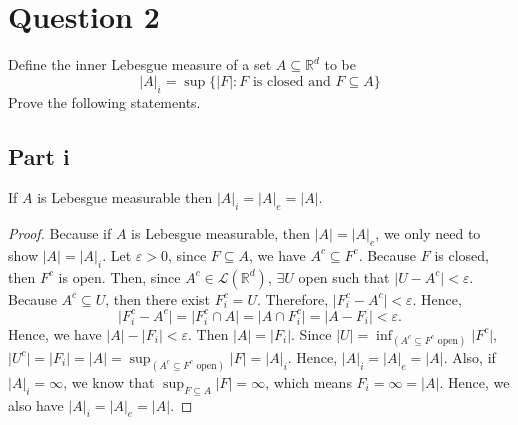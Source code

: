 \section{Question 2}

\begin{question}
    Define the inner Lebesgue measure of a set $A \subseteq \mathbb{R}^d$ to be
    $$
    |A|_i=\sup \{|F|: F \text { is closed and } F \subseteq A\}
    $$
    Prove the following statements.
\end{question}

\subsection{Part i}

\begin{question}
    If $A$ is Lebesgue measurable then $|A|_i=|A|_e=|A|$.
\end{question}

\begin{answer}
    \begin{proof}
        Because if $A$ is Lebesgue measurable, then $\lvert A \rvert = \lvert A \rvert_e$, we only need to show $\lvert A \rvert = \lvert A \rvert_i$. Let $\varepsilon > 0$, since $F \subseteq A$, we have $A^c \subseteq F^c$. Because $F$ is closed, then $F^c$ is open. Then, since $A^c \in \mathcal{L}(\mathbb{R}^d)$, $\exists U$ open such that $\lvert U - A^c \rvert < \varepsilon$. Because $A^c \subseteq U$, then there exist $F_i^c = U$. Therefore, $\lvert F_i^c - A^c \rvert < \varepsilon$. Hence,
        \begin{equation}
            \lvert F_i^c - A^c \rvert = \lvert F_i^c \cap A \rvert = \lvert A \cap F_i^c \rvert = \lvert A - F_i \rvert < \varepsilon.
        \end{equation}
        Hence, we have $\lvert A \rvert - \lvert F_i \rvert < \varepsilon$. Then $\lvert A \rvert  = \lvert F_i \rvert$. Since $\lvert U \rvert = \inf_{(A^c \subseteq F^c \text{ open})} \lvert F^c \rvert$, $\lvert U^c \rvert = \lvert F_i \rvert = \lvert A \rvert = \sup_{(A^c \subseteq F^c \text{ open})} \lvert F \rvert = \lvert A \rvert_i$. Hence, $\lvert A \rvert_i = \lvert A \rvert_e = \lvert A \rvert$. Also, if $\lvert A \rvert_i = \infty$, we know that $\sup_{F \subseteq A}\lvert F \rvert = \infty$, which means $F_i = \infty = \lvert A \rvert$. Hence, we also have $\lvert A \rvert_i = \lvert A \rvert_e = \lvert A \rvert$.
    \end{proof}
\end{answer}

